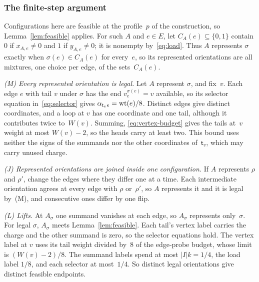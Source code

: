 \subsubsection{The finite-step argument}\label{app:ncl-transfer}

Configurations here are feasible at the profile~$p$ of the construction,
so Lemma~\ref{lem:feasible} applies. For such $A$ and $e\in E$, let $C_A(e)\subseteq\{0,1\}$ contain $0$ if $x_{A,e}\neq0$ and $1$
if $y_{A,e}\neq0$; it is nonempty by~\eqref{eq:load}. Thus $A$ represents
$\sigma$ exactly when $\sigma(e)\in C_A(e)$ for every~$e$, so its
represented orientations are all mixtures, one choice per edge, of the
sets~$C_A(e)$.

\emph{(M) Every represented orientation is legal.} Let $A$ represent
$\sigma$, and fix~$v$. Each edge $e$ with tail $v$ under $\sigma$ has the
end $v_e^{\sigma(e)}=v$ available, so its selector equation
in~\eqref{eq:selector} gives $\alpha_{\mathsf t_ve}=\operatorname{wt}(e)/8$. Distinct
edges give distinct coordinates, and a loop at $v$ has one coordinate and
one tail, although it contributes twice to~$W(v)$. Summing,
\eqref{eq:vertex-budget} gives the tails at~$v$ weight at most $W(v)-2$,
so the heads carry at least two. This bound uses neither the signs of the
summands nor the other coordinates of~$\mathsf t_v$, which may carry
unused charge.

\emph{(J) Represented orientations are joined inside one configuration.}
If $A$ represents $\rho$ and $\rho'$, change the edges where they differ one
at a time. Each intermediate orientation agrees at every edge with $\rho$
or~$\rho'$, so $A$ represents it and it is legal by~(M), and consecutive
ones differ by one flip.

\emph{(L) Lifts.} At $A_\sigma$ one summand vanishes at each edge, so
$A_\sigma$ represents only~$\sigma$. For legal $\sigma$, $A_\sigma$ meets
Lemma~\ref{lem:feasible}. Each tail's vertex label carries the charge and
the other summand is zero, so the selector equations hold. The vertex
label at $v$ uses its tail weight divided by~$8$ of the edge-probe budget,
whose limit is $(W(v)-2)/8$. The
summand labels spend at most $|I|k=1/4$, the load label $1/8$, and each
selector at most~$1/4$. So distinct legal orientations give distinct
feasible endpoints.

